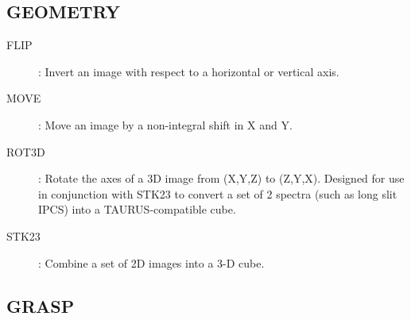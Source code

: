 \subsection {GEOMETRY}
\begin{description}
\item [FLIP]: Invert an image with respect to a horizontal or vertical axis.
\item [MOVE]: Move an image by a non-integral shift in X and Y.
\item [ROT3D]: Rotate the axes of a 3D image from (X,Y,Z) to (Z,Y,X).
Designed for use in conjunction with STK23 to convert a set of 2 spectra (such
as long slit IPCS) into a TAURUS-compatible cube.
\item [STK23]: Combine a set of 2D images into a 3-D cube.
\end{description}
\subsection {GRASP}

